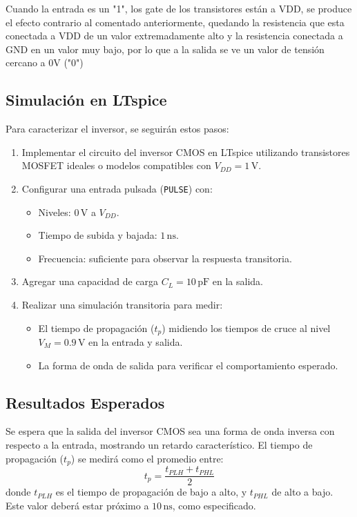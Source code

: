 \documentclass[11pt, a4paper]{article}
\begin{document}
Cuando la entrada es un "1", los gate de los transistores están a VDD, se produce el efecto contrario al comentado anteriormente, quedando la resistencia que esta conectada a VDD de un valor extremadamente alto y la resistencia conectada a GND en un valor muy bajo, por lo que a la salida se ve un valor de tensión cercano a 0V ("0")

\subsection{Simulación en LTspice}

Para caracterizar el inversor, se seguirán estos pasos:
\begin{enumerate}
    \item Implementar el circuito del inversor CMOS en LTspice utilizando transistores MOSFET ideales o modelos compatibles con \( V_{DD} = 1 \, \mathrm{V} \).
    \item Configurar una entrada pulsada (\texttt{PULSE}) con:
    \begin{itemize}
        \item Niveles: \( 0 \, \mathrm{V} \) a \( V_{DD} \).
        \item Tiempo de subida y bajada: \( 1 \, \mathrm{ns} \).
        \item Frecuencia: suficiente para observar la respuesta transitoria.
    \end{itemize}
    \item Agregar una capacidad de carga \( C_L = 10 \, \mathrm{pF} \) en la salida.
    \item Realizar una simulación transitoria para medir:
    \begin{itemize}
        \item El tiempo de propagación (\( t_p \)) midiendo los tiempos de cruce al nivel \( V_M = 0.9 \, \mathrm{V} \) en la entrada y salida.
        \item La forma de onda de salida para verificar el comportamiento esperado.
    \end{itemize}
\end{enumerate}

\subsection{Resultados Esperados}

Se espera que la salida del inversor CMOS sea una forma de onda inversa con respecto a la entrada, mostrando un retardo característico. El tiempo de propagación (\( t_p \)) se medirá como el promedio entre:
\[
t_p = \frac{t_{PLH} + t_{PHL}}{2}
\]
donde \( t_{PLH} \) es el tiempo de propagación de bajo a alto, y \( t_{PHL} \) de alto a bajo. Este valor deberá estar próximo a \( 10 \, \mathrm{ns} \), como especificado.
\end{document}

